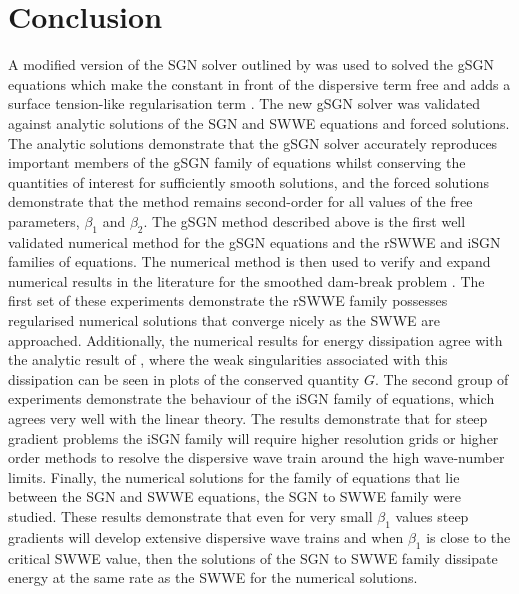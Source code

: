 \documentclass[10pt]{elsarticle}
\begin{document}
\section{Conclusion}
A modified version of the SGN solver outlined by \citet{Zoppou-etal-2017} was used to solved the gSGN equations which make the constant in front of the dispersive term free and adds a surface tension-like regularisation term \cite{Clamond-et.al-2017-245,Clamond-Dutykh-2018-237}. The new gSGN solver was validated against analytic solutions of the SGN and SWWE equations and forced solutions. The analytic solutions demonstrate that the gSGN solver accurately reproduces important members of the gSGN family of equations whilst conserving the quantities of interest for sufficiently smooth solutions, and the forced solutions demonstrate that the method remains second-order for all values of the free parameters, $\beta_1$ and $\beta_2$. The gSGN method described above is the first well validated numerical method for the gSGN equations and the rSWWE and iSGN families of equations. The numerical method is then used to verify and expand numerical results in the literature for the smoothed dam-break problem \cite{Clamond-Dutykh-2018-237,Clamond-et.al-2017-245,Pu-2018-1361}. The first set of these experiments demonstrate the rSWWE family possesses regularised numerical solutions that converge nicely as the SWWE are approached. Additionally, the numerical results for energy dissipation agree with the analytic result of \citet{Pu-2018-1361}, where the weak singularities associated with this dissipation can be seen in plots of the conserved quantity $G$. The second group of experiments demonstrate the behaviour of the iSGN family of equations, which agrees very well with the linear theory. The results demonstrate that for steep gradient problems the iSGN family will require higher resolution grids or higher order methods to resolve the dispersive wave train around the high wave-number limits. Finally, the numerical solutions for the family of equations that lie between the SGN and SWWE equations, the SGN to SWWE family were studied. These results demonstrate that even for very small $\beta_1$ values steep gradients will develop extensive dispersive wave trains and when $\beta_1$ is close to the critical SWWE value, then the solutions of the SGN to SWWE family dissipate energy at the same rate as the SWWE for the numerical solutions. 



\end{document}
